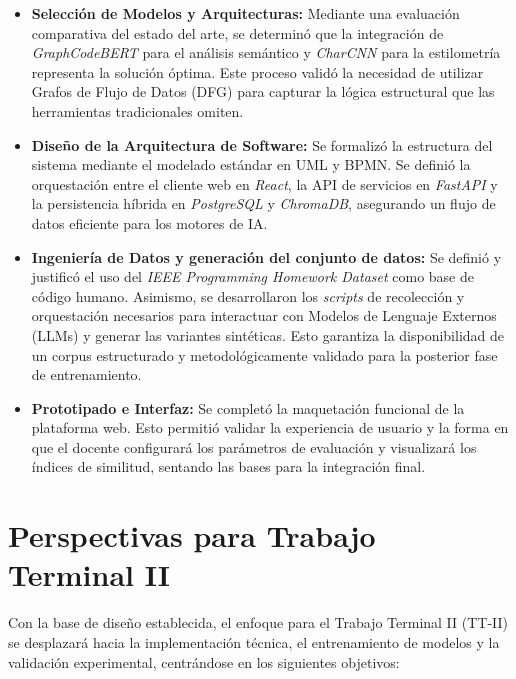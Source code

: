 \begin{itemize}
    \item \textbf{Selección de Modelos y Arquitecturas:} Mediante una evaluación comparativa del estado del arte, se determinó que la integración de \textit{GraphCodeBERT} para el análisis semántico y \textit{CharCNN} para la estilometría representa la solución óptima. Este proceso validó la necesidad de utilizar Grafos de Flujo de Datos (DFG) para capturar la lógica estructural que las herramientas tradicionales omiten.
    
    \item \textbf{Diseño de la Arquitectura de Software:} Se formalizó la estructura del sistema mediante el modelado estándar en UML y BPMN. Se definió la orquestación entre el cliente web en \textit{React}, la API de servicios en \textit{FastAPI} y la persistencia híbrida en \textit{PostgreSQL} y \textit{ChromaDB}, asegurando un flujo de datos eficiente para los motores de IA.
    
    \item \textbf{Ingeniería de Datos y generación del conjunto de datos:} Se definió y justificó el uso del \textit{IEEE Programming Homework Dataset} como base de código humano. Asimismo, se desarrollaron los \textit{scripts} de recolección y orquestación necesarios para interactuar con Modelos de Lenguaje Externos (LLMs) y generar las variantes sintéticas. Esto garantiza la disponibilidad de un corpus estructurado y metodológicamente validado para la posterior fase de entrenamiento.

    \item \textbf{Prototipado e Interfaz:} Se completó la maquetación funcional de la plataforma web. Esto permitió validar la experiencia de usuario y la forma en que el docente configurará los parámetros de evaluación y visualizará los índices de similitud, sentando las bases para la integración final.
\end{itemize}

\section{Perspectivas para Trabajo Terminal II}

Con la base de diseño establecida, el enfoque para el Trabajo Terminal II (TT-II) se desplazará hacia la implementación técnica, el entrenamiento de modelos y la validación experimental, centrándose en los siguientes objetivos:

